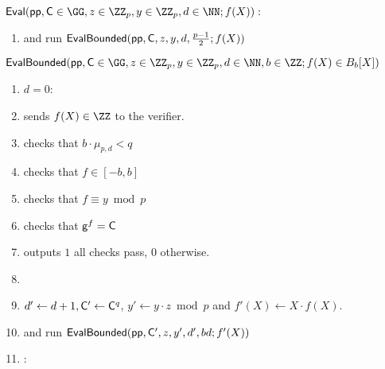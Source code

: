 \documentclass{article}
\theoremstyle{definition}
\begin{document}
\begin{mdframed}
\begin{minipage}{\textwidth}
			$\pro{Eval}(\crs, \gr{C}\in \GG, z\in \ZZ_p, y\in \ZZ_p, d \in \NN; f(X)) :$ 
			\begin{enumerate}[nolistsep]
			\item \prover and \verifier run $\textsf{{EvalBounded}}(\textsf{pp},\mathsf{C},z,y,d,\frac{p-1}{2};f(X))$
		    \end{enumerate}
		$\pro{EvalBounded}(\crs,\gr{C}\in \GG,z\in \ZZ_p,y\in \ZZ_p,d\in \NN,b\in \ZZ;f(X)\in B_{b}[X])$
	    \begin{enumerate}[nolistsep]
        \item \pcif $d=0$:
        \item \pcind[1] \prover sends $f(X)\in \ZZ$ to the verifier. 
        \item \pcind[1] \verifier checks that $b\cdot \mu_{p,d} < q$
        \item \pcind[1] \verifier checks that $f \in [-b,b]$
          \item \pcind[1] \verifier checks that $f\equiv y \bmod p$
                \item \pcind[1] \verifier checks that $\mathsf{g}^{f}=\mathsf{C}$
\item \pcind[1] \verifier outputs $1$ \pcif all checks pass, $0$ otherwise.
          \item {}
         \item \pcind[1]  $d'\gets d+1, \mathsf{C}'\gets \mathsf{C}^q$, $y'\gets y\cdot z \bmod p$ and $f'(X)\gets X \cdot f(X)$.
         \item \pcind[1] \prover and \verifier run $\textsf{{EvalBounded}}(\textsf{pp},\mathsf{C}',z,y',d',bd;f'(X))$

        \item \pcelse: 
       

\end{enumerate}
\end{minipage}
\end{mdframed}
\end{document}
